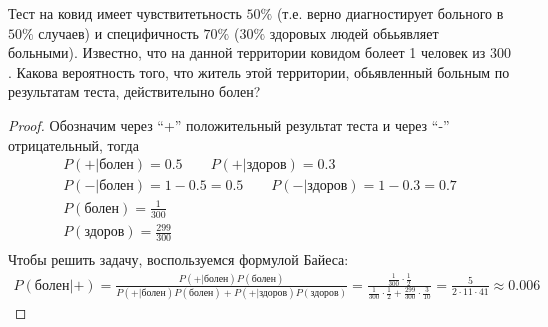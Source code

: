     \begin{prob}
        Тест на ковид имеет чувствитетьность $50\%$ (т.е. верно диагностирует больного в $50\%$ случаев) и специфичность $70\%$ ($30\%$ здоровых людей обььявляет больными). Известно, что на данной территории ковидом болеет 1 человек из $300$. Какова вероятность того, что житель этой территории, обьявленный больным по результатам теста, действителыно болен?
    \end{prob}
    \begin{proof}
        Обозначим через ``+'' положительный результат теста и через ``-'' отрицательный, тогда
        \begin{gather*}
            P(+|\text{болен}) = 0.5\qquad
            P(+|\text{здоров}) = 0.3\\
            P(-|\text{болен}) = 1 - 0.5 = 0.5\qquad
            P(-|\text{здоров}) = 1 - 0.3 = 0.7\\
            P(\text{болен}) = \frac{1}{300}\\
            P(\text{здоров}) = \frac{299}{300}\\
        \end{gather*}
        Чтобы решить задачу, воспользуемся формулой Байеса:
        \begin{gather*}
            P(\text{болен}| +)
            = \frac{P(+|\text{болен}) P(\text{болен})}{P(+|\text{болен}) P(\text{болен}) + P(+|\text{здоров}) P(\text{здоров})}
            = \frac{\frac{1}{300} \cdot \frac{1}{2}}
            {\frac{1}{300} \cdot \frac{1}{2} + \frac{299}{300} \cdot \frac{3}{10}} = \frac{5}{2 \cdot 11 \cdot 41} \approx 0.006
        \end{gather*}  
    \end{proof}
\vskip 0.6in


